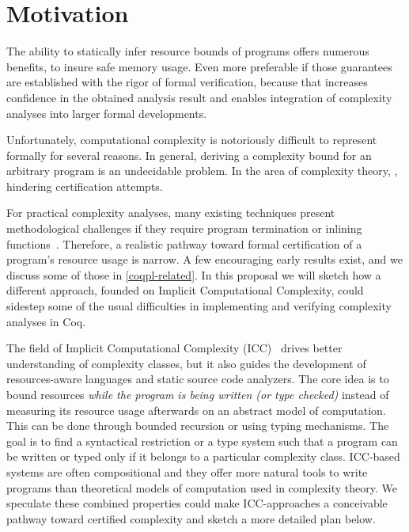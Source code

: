 \tocless\section{Motivation}

The ability to statically infer resource bounds of programs offers numerous benefits, \eg
to insure safe memory usage.
Even more preferable if those guarantees are established with the rigor of formal verification,
because that increases confidence in the obtained analysis result and enables integration of complexity
analyses into larger formal developments.

Unfortunately, computational complexity is notoriously difficult to represent formally for several reasons.
In general, deriving a complexity bound for an arbitrary program is an undecidable problem. %
In the area of complexity theory, , hindering certification attempts.

For practical complexity analyses, many existing techniques present methodological challenges if they require \eg program termination or inlining functions~\cite{carbonneaux2015}.
Therefore, a realistic pathway toward formal certification of a program's resource usage is narrow.
A few encouraging early results exist, and we discuss some of those in \autoref{coqpl-related}.
In this proposal we will sketch how a different approach, founded on Implicit Computational Complexity,
could sidestep some of the usual difficulties in implementing and verifying complexity analyses in Coq.

The field of Implicit Computational Complexity (ICC)~\cite{dallago2011} drives better understanding of complexity classes, but it
also guides the development of resources-aware languages and static source code analyzers.
The core idea is to bound resources \emph{while the program is being written (or type checked)} instead of measuring its resource usage afterwards on an abstract model of computation.
This can be done through \eg bounded recursion or using typing mechanisms.
The goal is to find a syntactical restriction or a type system such that a program can be written or typed only if it belongs to a particular complexity class.
ICC-based systems are often compositional and they offer more natural tools to write programs than theoretical models of computation used in complexity theory.
We speculate these combined properties could make ICC-approaches a conceivable pathway toward certified complexity and sketch a more detailed plan below.

